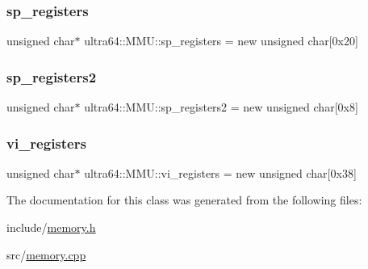 \subsubsection{\texorpdfstring{sp\+\_\+registers}{sp\_registers}}
{\footnotesize\ttfamily unsigned char$\ast$ ultra64\+::\+M\+M\+U\+::sp\+\_\+registers = new unsigned char\mbox{[}0x20\mbox{]}\hspace{0.3cm}{\ttfamily [private]}}

\mbox{\label{classultra64_1_1_m_m_u_aad78b94bfb2096b563b7de68cddca76c}} 
\subsubsection{\texorpdfstring{sp\+\_\+registers2}{sp\_registers2}}
{\footnotesize\ttfamily unsigned char$\ast$ ultra64\+::\+M\+M\+U\+::sp\+\_\+registers2 = new unsigned char\mbox{[}0x8\mbox{]}\hspace{0.3cm}{\ttfamily [private]}}

\mbox{\label{classultra64_1_1_m_m_u_ab72c6d87f83e2c99ed0e2e9f43f1f240}} 
\subsubsection{\texorpdfstring{vi\+\_\+registers}{vi\_registers}}
{\footnotesize\ttfamily unsigned char$\ast$ ultra64\+::\+M\+M\+U\+::vi\+\_\+registers = new unsigned char\mbox{[}0x38\mbox{]}\hspace{0.3cm}{\ttfamily [private]}}



The documentation for this class was generated from the following files\+:\begin{DoxyCompactItemize}
\item 
include/\hyperlink{memory_8h}{memory.\+h}\item 
src/\hyperlink{memory_8cpp}{memory.\+cpp}\end{DoxyCompactItemize}
